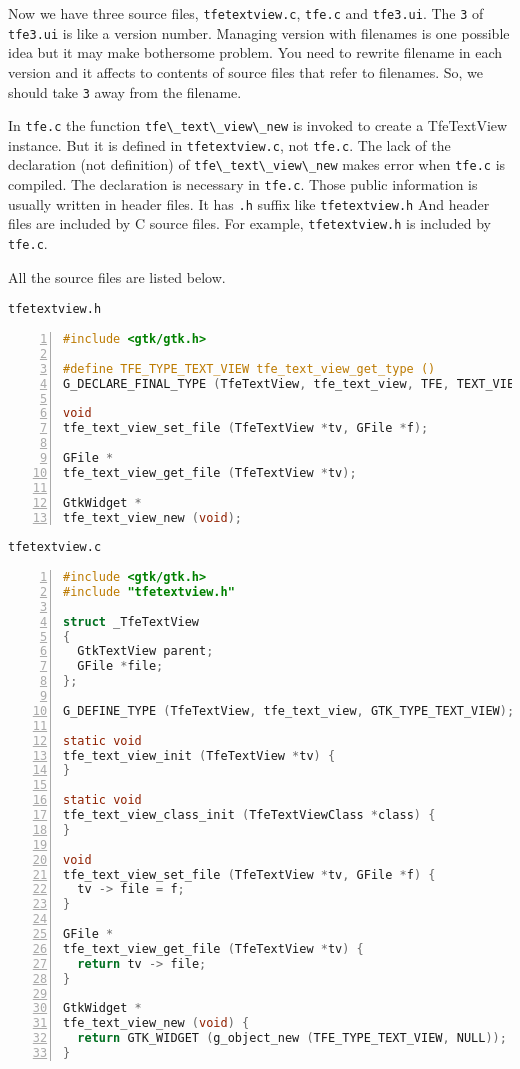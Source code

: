 Now we have three source files, \passthrough{\lstinline!tfetextview.c!},
\passthrough{\lstinline!tfe.c!} and \passthrough{\lstinline!tfe3.ui!}.
The \passthrough{\lstinline!3!} of \passthrough{\lstinline!tfe3.ui!} is
like a version number. Managing version with filenames is one possible
idea but it may make bothersome problem. You need to rewrite filename in
each version and it affects to contents of source files that refer to
filenames. So, we should take \passthrough{\lstinline!3!} away from the
filename.

In \passthrough{\lstinline!tfe.c!} the function
\passthrough{\lstinline!tfe\_text\_view\_new!} is invoked to create a
TfeTextView instance. But it is defined in
\passthrough{\lstinline!tfetextview.c!}, not
\passthrough{\lstinline!tfe.c!}. The lack of the declaration (not
definition) of \passthrough{\lstinline!tfe\_text\_view\_new!} makes
error when \passthrough{\lstinline!tfe.c!} is compiled. The declaration
is necessary in \passthrough{\lstinline!tfe.c!}. Those public
information is usually written in header files. It has
\passthrough{\lstinline!.h!} suffix like
\passthrough{\lstinline!tfetextview.h!} And header files are included by
C source files. For example, \passthrough{\lstinline!tfetextview.h!} is
included by \passthrough{\lstinline!tfe.c!}.

All the source files are listed below.

\passthrough{\lstinline!tfetextview.h!}

\begin{lstlisting}[language=C, numbers=left]
#include <gtk/gtk.h>

#define TFE_TYPE_TEXT_VIEW tfe_text_view_get_type ()
G_DECLARE_FINAL_TYPE (TfeTextView, tfe_text_view, TFE, TEXT_VIEW, GtkTextView)

void
tfe_text_view_set_file (TfeTextView *tv, GFile *f);

GFile *
tfe_text_view_get_file (TfeTextView *tv);

GtkWidget *
tfe_text_view_new (void);
\end{lstlisting}

\passthrough{\lstinline!tfetextview.c!}

\begin{lstlisting}[language=C, numbers=left]
#include <gtk/gtk.h>
#include "tfetextview.h"

struct _TfeTextView
{
  GtkTextView parent;
  GFile *file;
};

G_DEFINE_TYPE (TfeTextView, tfe_text_view, GTK_TYPE_TEXT_VIEW);

static void
tfe_text_view_init (TfeTextView *tv) {
}

static void
tfe_text_view_class_init (TfeTextViewClass *class) {
}

void
tfe_text_view_set_file (TfeTextView *tv, GFile *f) {
  tv -> file = f;
}

GFile *
tfe_text_view_get_file (TfeTextView *tv) {
  return tv -> file;
}

GtkWidget *
tfe_text_view_new (void) {
  return GTK_WIDGET (g_object_new (TFE_TYPE_TEXT_VIEW, NULL));
}
\end{lstlisting}

